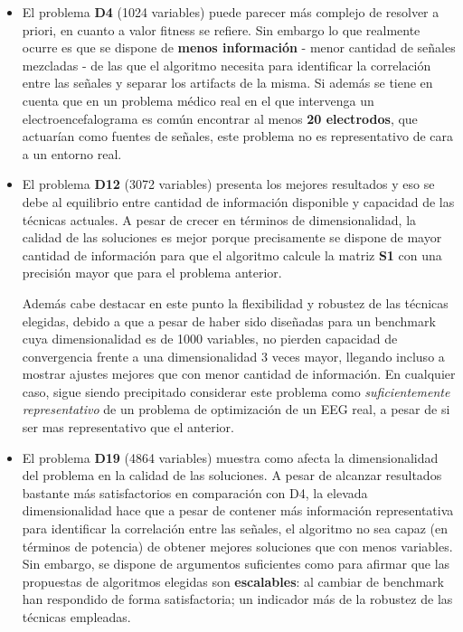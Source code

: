 \begin{itemize}
	\item El problema \textbf{D4} (1024 variables) puede parecer más complejo de resolver a priori, en cuanto a valor fitness se refiere. Sin embargo lo que realmente ocurre es que se dispone de \textbf{menos información} - menor cantidad de señales mezcladas - de las que el algoritmo necesita para identificar la correlación entre las señales y separar los artifacts de la misma. Si además se tiene en cuenta que en un problema médico real en el que intervenga un electroencefalograma es común encontrar al menos \textbf{20 electrodos}, que actuarían como fuentes de señales, este problema no es representativo de cara a un entorno real.
	
	\item El problema \textbf{D12} (3072 variables) presenta los mejores resultados y eso se debe al equilibrio entre cantidad de información disponible y capacidad de las técnicas actuales. A pesar de crecer en términos de dimensionalidad, la calidad de las soluciones es mejor porque precisamente se dispone de mayor cantidad de información para que el algoritmo calcule la matriz \textbf{S1} con una precisión mayor que para el problema anterior. 
	
	Además cabe destacar en este punto la flexibilidad y robustez de las técnicas elegidas, debido a que a pesar de haber sido diseñadas para un benchmark cuya dimensionalidad es de 1000 variables, no pierden capacidad de convergencia frente a una dimensionalidad  3 veces mayor, llegando incluso a mostrar ajustes mejores que con menor cantidad de información. En cualquier caso, sigue siendo precipitado considerar este problema como \textit{suficientemente representativo} de un problema de optimización de un EEG real, a pesar de si ser mas representativo que el anterior.
	
	\item El problema \textbf{D19} (4864 variables) muestra como afecta la dimensionalidad del problema en la calidad de las soluciones. A pesar de alcanzar resultados bastante más satisfactorios en comparación con D4, la elevada dimensionalidad hace que a pesar de contener más información representativa para identificar la correlación entre las señales, el algoritmo no sea capaz (en términos de potencia) de obtener mejores soluciones que con menos variables. Sin embargo, se dispone de argumentos suficientes como para afirmar que las propuestas de algoritmos elegidas son \textbf{escalables}: al cambiar de benchmark han respondido de forma satisfactoria; un indicador más de la robustez de las técnicas empleadas.
	

\end{itemize}
